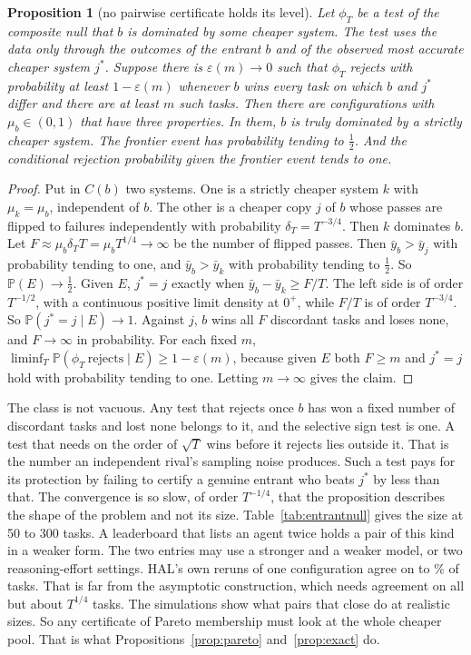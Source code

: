 \documentclass[11pt]{article}
\renewcommand{\Pr}{\mathbb{P}}
\newtheorem{proposition}{Proposition}
\begin{document}
\begin{proposition}[no pairwise certificate holds its level]
\label{prop:impossible}
Let $\phi_T$ be a test of the composite null that $b$ is dominated by some cheaper system. The test uses the data only through the outcomes of the entrant $b$ and of the observed most accurate cheaper system $j^*$. Suppose there is $\varepsilon(m)\to0$ such that $\phi_T$ rejects with probability at least $1-\varepsilon(m)$ whenever $b$ wins every task on which $b$ and $j^*$ differ and there are at least $m$ such tasks. Then there are configurations with $\mu_b\in(0,1)$ that have three properties. In them, $b$ is truly dominated by a strictly cheaper system. The frontier event has probability tending to $\tfrac12$. And the conditional rejection probability given the frontier event tends to one.
\end{proposition}
\begin{proof}
Put in $C(b)$ two systems. One is a strictly cheaper system $k$ with $\mu_k=\mu_b$, independent of $b$. The other is a cheaper copy $j$ of $b$ whose passes are flipped to failures independently with probability $\delta_T=T^{-3/4}$. Then $k$ dominates $b$. Let $F\approx\mu_b\delta_TT=\mu_bT^{1/4}\to\infty$ be the number of flipped passes. Then $\bar y_b>\bar y_j$ with probability tending to one, and $\bar y_b>\bar y_k$ with probability tending to $\tfrac12$. So $\Pr(E)\to\tfrac12$. Given $E$, $j^*=j$ exactly when $\bar y_b-\bar y_k\ge F/T$. The left side is of order $T^{-1/2}$, with a continuous positive limit density at $0^+$, while $F/T$ is of order $T^{-3/4}$. So $\Pr(j^*=j\mid E)\to1$. Against $j$, $b$ wins all $F$ discordant tasks and loses none, and $F\to\infty$ in probability. For each fixed $m$, $\liminf_T\Pr(\phi_T\ \text{rejects}\mid E)\ge1-\varepsilon(m)$, because given $E$ both $F\ge m$ and $j^*=j$ hold with probability tending to one. Letting $m\to\infty$ gives the claim.
\end{proof}
The class is not vacuous. Any test that rejects once $b$ has won a fixed number of discordant tasks and lost none belongs to it, and the selective sign test is one. A test that needs on the order of $\sqrt T$ wins before it rejects lies outside it. That is the number an independent rival's sampling noise produces. Such a test pays for its protection by failing to certify a genuine entrant who beats $j^*$ by less than that. The convergence is so slow, of order $T^{-1/4}$, that the proposition describes the shape of the problem and not its size. Table~\ref{tab:entrantnull} gives the size at 50 to 300 tasks. A leaderboard that lists an agent twice holds a pair of this kind in a weaker form. The two entries may use a stronger and a weaker model, or two reasoning-effort settings. HAL's own reruns of one configuration agree on \NumRerunAgreeMin{} to \NumRerunAgreeMax\% of tasks. That is far from the asymptotic construction, which needs agreement on all but about $T^{1/4}$ tasks. The simulations show what pairs that close do at realistic sizes. So any certificate of Pareto membership must look at the whole cheaper pool. That is what Propositions~\ref{prop:pareto} and~\ref{prop:exact} do.
\end{document}
